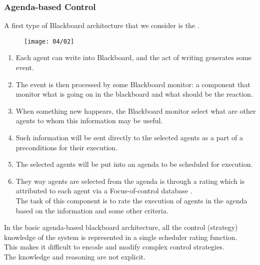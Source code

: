 \subsubsection{Agenda-based Control}
A first type of Blackboard architecture that we consider is the .
\begin{figure}[!h]
\centering
\texttt{[image: 04/02]}
\end{figure}
\begin{enumerate}
\item Each agent can write into Blackboard, and the act of writing generates some event. 
\item The event is then processed by some Blackboard monitor: a component that monitor what is going on in the blackboard and what should be the reaction.
\item When something new happears, the Blackboard monitor select what are other agents to whom this information may be useful.\\
\item Such information will be sent directly to the selected agents as a part of a preconditions for their execution. 
\item The selected agents will be put into an agenda to be scheduled for execution.
\item They way agents are selected from the agenda is through a rating which is attributed to each agent via a Focus-of-control database .\\
The task of this component  is to rate the execution of agents in the agenda based on the information and some other criteria.
\end{enumerate}
In the basic agenda-based blackboard architecture, all the control (strategy) knowledge of the system is represented in a single scheduler rating function.\\
This makes it difficult to encode and modify complex control strategies.\\
The knowledge and reasoning are not explicit.

